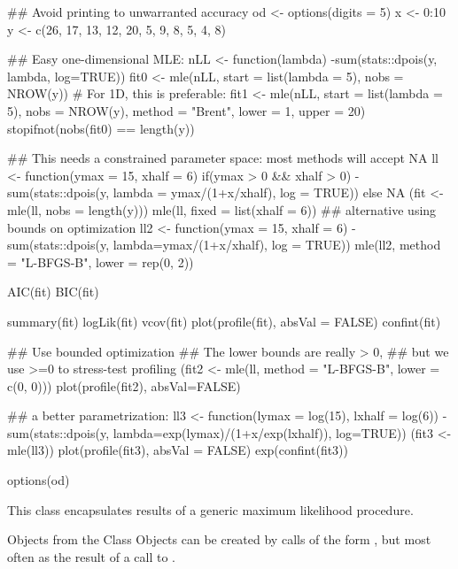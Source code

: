 \begin{Examples}
\begin{ExampleCode}
## Avoid printing to unwarranted accuracy
od <- options(digits = 5)
x <- 0:10
y <- c(26, 17, 13, 12, 20, 5, 9, 8, 5, 4, 8)

## Easy one-dimensional MLE:
nLL <- function(lambda) -sum(stats::dpois(y, lambda, log=TRUE))
fit0 <- mle(nLL, start = list(lambda = 5), nobs = NROW(y))
# For 1D, this is preferable:
fit1 <- mle(nLL, start = list(lambda = 5), nobs = NROW(y),
            method = "Brent", lower = 1, upper = 20)
stopifnot(nobs(fit0) == length(y))

## This needs a constrained parameter space: most methods will accept NA
ll <- function(ymax = 15, xhalf = 6) {
    if(ymax > 0 && xhalf > 0)
      -sum(stats::dpois(y, lambda = ymax/(1+x/xhalf), log = TRUE))
    else NA
}
(fit <- mle(ll, nobs = length(y)))
mle(ll, fixed = list(xhalf = 6))
## alternative using bounds on optimization
ll2 <- function(ymax = 15, xhalf = 6)
    -sum(stats::dpois(y, lambda=ymax/(1+x/xhalf), log = TRUE))
mle(ll2, method = "L-BFGS-B", lower = rep(0, 2))

AIC(fit)
BIC(fit)

summary(fit)
logLik(fit)
vcov(fit)
plot(profile(fit), absVal = FALSE)
confint(fit)

## Use bounded optimization
## The lower bounds are really > 0,
## but we use >=0 to stress-test profiling
(fit2 <- mle(ll, method = "L-BFGS-B", lower = c(0, 0)))
plot(profile(fit2), absVal=FALSE)

## a better parametrization:
ll3 <- function(lymax = log(15), lxhalf = log(6))
    -sum(stats::dpois(y, lambda=exp(lymax)/(1+x/exp(lxhalf)), log=TRUE))
(fit3 <- mle(ll3))
plot(profile(fit3), absVal = FALSE)
exp(confint(fit3))

options(od)
\end{ExampleCode}
\end{Examples}
%
\begin{Description}\relax
This class encapsulates results of a generic maximum
likelihood procedure.
\end{Description}
%
\begin{Section}{Objects from the Class}
Objects can be created by calls of the form , but
most often as the result of a call to .
\end{Section}
